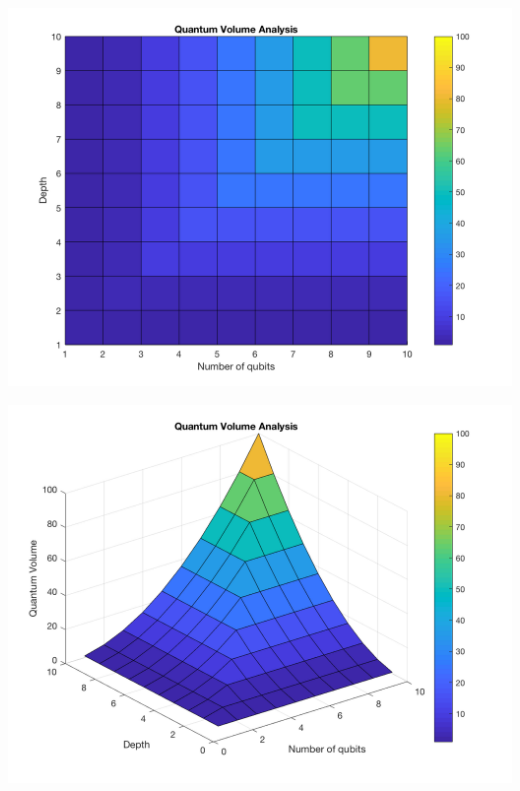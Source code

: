 \documentclass[11pt]{article}
\begin{document}
\begin{minipage}{.45\textwidth}

\centering

\begin{center}
\includegraphics[width=.9\linewidth]{V_q_analysis2.png}
\end{center} 

\label{fig:algorithmQV2}

\end{minipage}%
\hspace{1cm}
\begin{minipage}{.45\textwidth}

\begin{center}
\includegraphics[width=.9\linewidth]{V_q_analysis1.png}
\end{center} 

\label{fig:algorithmQV1}

\end{minipage}%
\end{document}
